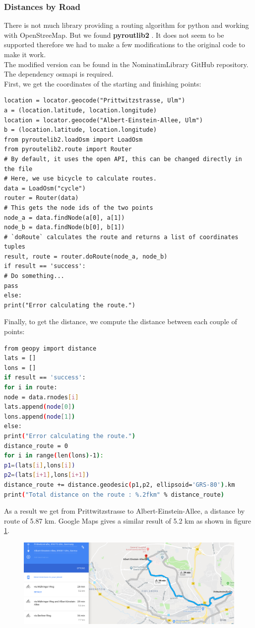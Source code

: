 \documentclass[12pt]{article}
\begin{document}
\subsubsection{Distances by Road}
There is not much library providing a routing algorithm for python and working with OpenStreeMap.
But we found \textbf{pyroutlib2} \citep{OpenStreetMap2017}. It does not seem to be supported therefore we
had to make a few modifications to the original code to make it work.\\
The modified version can be found in the NominatimLibrary GitHub repository.\\
The dependency osmapi is required.\\
First, we get the coordinates of the starting and finishing points:
\begin{lstlisting}[breaklines=true]
location = locator.geocode("Prittwitzstrasse, Ulm")
a = (location.latitude, location.longitude)
location = locator.geocode("Albert-Einstein-Allee, Ulm")
b = (location.latitude, location.longitude)
from pyroutelib2.loadOsm import LoadOsm
from pyroutelib2.route import Router
# By default, it uses the open API, this can be changed directly in the file
# Here, we use bicycle to calculate routes.
data = LoadOsm("cycle")
router = Router(data)
# This gets the node ids of the two points
node_a = data.findNode(a[0], a[1])
node_b = data.findNode(b[0], b[1])
# `doRoute` calculates the route and returns a list of coordinates tuples
result, route = router.doRoute(node_a, node_b)
if result == 'success':
# Do something...
pass
else:
print("Error calculating the route.")
\end{lstlisting}
Finally, to get the distance, we compute the distance between each couple of points:
\begin{lstlisting}[language=bash,breaklines=true]
from geopy import distance
lats = []
lons = []
if result == 'success':
for i in route:
node = data.rnodes[i]
lats.append(node[0])
lons.append(node[1])
else:
print("Error calculating the route.")
distance_route = 0
for i in range(len(lons)-1):
p1=(lats[i],lons[i])
p2=(lats[i+1],lons[i+1])
distance_route += distance.geodesic(p1,p2, ellipsoid='GRS-80').km
print("Total distance on the route : %.2fkm" % distance_route)
\end{lstlisting}
As a result we get from Prittwitzstrasse to Albert-Einstein-Allee, a distance by route of 5.87 km. 
Google Maps gives a similar result of 5.2 km as shown in figure \ref{fig:route}.
\begin{figure}[H]
\hspace{-1.3cm}
\includegraphics[width=1.3\textwidth]{img/route}
\label{fig:route}
\end{figure}
\end{document}
